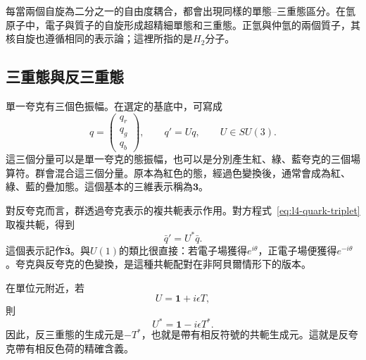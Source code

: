 每當兩個自旋為二分之一的自由度耦合，都會出現同樣的單態--三重態區分。在氫原子中，電子與質子的自旋形成超精細單態和三重態。正氫與仲氫的兩個質子，其核自旋也遵循相同的表示論；這裡所指的是\(H_2\)分子。

\subsection{三重態與反三重態}

單一夸克有三個色振幅。在選定的基底中，可寫成
\begin{equation}
q=
\begin{pmatrix}
q_r\\q_g\\q_b
\end{pmatrix},
\qquad
q'=Uq,
\qquad U\in SU(3).
\label{eq:l4-quark-triplet}
\end{equation}
這三個分量可以是單一夸克的態振幅，也可以是分別產生紅、綠、藍夸克的三個場算符。群會混合這三個分量。原本為紅色的態，經過色變換後，通常會成為紅、綠、藍的疊加態。這個基本的三維表示稱為\(\boldsymbol 3\)。

對反夸克而言，群透過夸克表示的複共軛表示作用。對方程式~\eqref{eq:l4-quark-triplet}取複共軛，得到
\begin{equation}
\bar q'=U^*\bar q.
\end{equation}
這個表示記作\(\bar{\boldsymbol 3}\)。與\(U(1)\)的類比很直接：若電子場獲得\(e^{i\theta}\)，正電子場便獲得\(e^{-i\theta}\)。夸克與反夸克的色變換，是這種共軛配對在非阿貝爾情形下的版本。

在單位元附近，若
\begin{equation}
U=\boldsymbol 1+i\epsilon T,
\end{equation}
則
\begin{equation}
U^*=\boldsymbol 1-i\epsilon T^*.
\end{equation}
因此，反三重態的生成元是\(-T^*\)，也就是帶有相反符號的共軛生成元。這就是反夸克帶有相反色荷的精確含義。

\begin{classroomqa}
\end{classroomqa}

